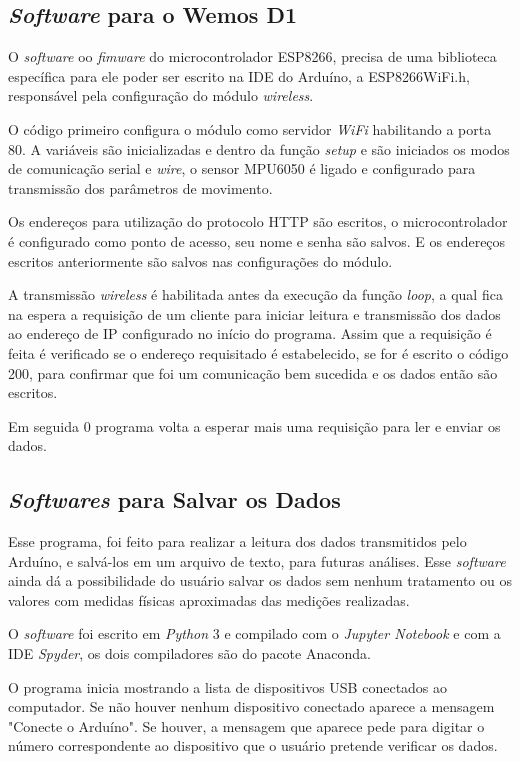 \subsection{\textit{Software} para o Wemos D1}

	O \textit{software} oo \textit{fimware} do microcontrolador ESP8266,  precisa de uma biblioteca específica para ele poder ser escrito na IDE do Arduíno, a ESP8266WiFi.h, responsável pela configuração do módulo \textit{wireless}. 
	
	O código primeiro configura o módulo como servidor \textit{WiFi} habilitando a porta 80.  A variáveis são inicializadas e dentro da função \textit{setup} e são iniciados os modos de comunicação serial e \textit{wire},  o sensor MPU6050 é ligado e configurado para transmissão  dos parâmetros de movimento. 
	
	Os endereços para utilização do protocolo HTTP são escritos,  o microcontrolador é configurado como ponto de acesso, seu nome e senha são salvos. E os endereços escritos anteriormente são salvos nas configurações do módulo.

	A transmissão \textit{wireless} é habilitada antes da execução da função \textit{loop}, a qual fica na espera a requisição de um cliente para iniciar leitura e transmissão dos dados ao endereço de IP configurado no início do programa. Assim que a requisição é feita é verificado se o endereço requisitado é estabelecido, se for é escrito o código 200, para confirmar que foi um comunicação bem sucedida e os dados então são escritos.
	
	Em seguida 0 programa volta a esperar mais uma requisição para ler e enviar os dados.
		 
\subsection{\textit{Softwares} para Salvar os Dados}

		Esse programa, foi feito para realizar a leitura dos dados transmitidos pelo Arduíno, e salvá-los em um arquivo de texto, para futuras análises. Esse \textit{software} ainda dá a possibilidade do usuário salvar os dados sem nenhum tratamento ou os valores com medidas físicas aproximadas das medições realizadas. 
		
		O \textit{software} foi escrito em \textit{Python} 3 e compilado com o \textit{Jupyter Notebook} e com a IDE \textit{Spyder}, os dois compiladores são do pacote Anaconda. 
		
		O programa inicia mostrando a lista de dispositivos USB conectados ao computador. Se não houver nenhum dispositivo conectado aparece a mensagem "Conecte o Arduíno". Se houver, a mensagem que aparece pede para digitar o número correspondente ao dispositivo que o usuário pretende verificar os dados. 
		
